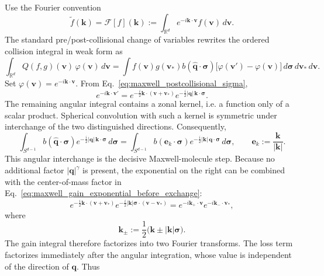 \documentclass[11pt,oneside]{article}
\numberwithin{equation}{section}
\theoremstyle{definition}
\begin{document}
Use the Fourier convention
\begin{equation}
\widetilde f(\bm k)
=\mathcal F[f](\bm k)
:=\int_{\mathbb R^d}e^{-i\bm k\cdot\bm v}f(\bm v)\,d\bm v.
\label{eq:maxwell_fourier_transform}
\end{equation}
The standard pre/post-collisional change of variables rewrites the ordered collision integral in weak form as
\begin{equation}
\int_{\mathbb R^d}Q(f,g)(\bm v)\,\varphi(\bm v)\,d\bm v
=
\int f(\bm v)g(\bm v_*)
 b(\widehat{\bm q}\!\cdot\!\bm\sigma)
 \big[\varphi(\bm v')-\varphi(\bm v)\big]
 \,d\bm\sigma\,d\bm v_*\,d\bm v.
\label{eq:maxwell_weak_form_ordered}
\end{equation}
Set $\varphi(\bm v)=e^{-i\bm k\cdot\bm v}$.  From Eq.~\eqref{eq:maxwell_postcollisional_sigma},
\begin{equation}
e^{-i\bm k\cdot\bm v'}
=
e^{-\frac{i}{2}\bm k\cdot(\bm v+\bm v_*)}
 e^{-\frac{i}{2}|\bm q|\,\bm k\cdot\bm\sigma}.
\label{eq:maxwell_gain_exponential_before_exchange}
\end{equation}
The remaining angular integral contains a zonal kernel, i.e. a function only of a scalar product.  Spherical convolution with such a kernel is symmetric under interchange of the two distinguished directions.  Consequently,
\begin{equation}
\int_{S^{d-1}}
 b(\widehat{\bm q}\!\cdot\!\bm\sigma)
 e^{-\frac{i}{2}|\bm q|\,\bm k\cdot\bm\sigma}
 \,d\bm\sigma
=
\int_{S^{d-1}}
 b(\bm e_k\!\cdot\!\bm\sigma)
 e^{-\frac{i}{2}|\bm k|\,\bm q\cdot\bm\sigma}
 \,d\bm\sigma,
\qquad
\bm e_k:=\frac{\bm k}{|\bm k|}.
\label{eq:maxwell_bobylev_angular_exchange}
\end{equation}
This angular interchange is the decisive Maxwell-molecule step.  Because no additional factor $|\bm q|^\gamma$ is present, the exponential on the right can be combined with the center-of-mass factor in Eq.~\eqref{eq:maxwell_gain_exponential_before_exchange}:
\begin{equation}
e^{-\frac{i}{2}\bm k\cdot(\bm v+\bm v_*)}
 e^{-\frac{i}{2}|\bm k|\bm\sigma\cdot(\bm v-\bm v_*)}
=
e^{-i\bm k_+\cdot\bm v}
e^{-i\bm k_-\cdot\bm v_*},
\label{eq:maxwell_bobylev_factorization_step}
\end{equation}
where
\begin{equation}
\bm k_\pm
:=\frac12\bigl(\bm k\pm|\bm k|\bm\sigma\bigr).
\label{eq:maxwell_kpm}
\end{equation}
The gain integral therefore factorizes into two Fourier transforms.  The loss term factorizes immediately after the angular integration, whose value is independent of the direction of $\bm q$.  Thus
\end{document}
